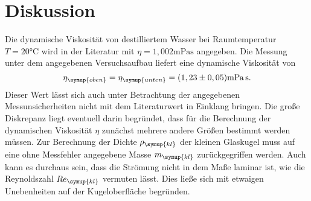 \section{Diskussion}
\label{sec:Diskussion}
Die dynamische Viskosität von destilliertem Wasser bei Raumtemperatur $T=20\unit{\celsius}$ wird in der
Literatur mit $\eta = 1,002\unit{\milli\pascal\second}$ \cite{dichte} angegeben. Die Messung unter dem 
angegebenen Versuchsaufbau liefert eine dynamische Viskosität von 
\begin{equation}
  \eta_{\symup{oben}} = \eta_{\symup{unten}} = (1,23\pm0,05)\unit{\milli\pascal\second}. \notag
\end{equation}
Dieser Wert lässt sich auch unter 
Betrachtung der angegebenen Messunsicherheiten nicht mit dem Literaturwert in Einklang bringen. Die große Diskrepanz liegt
eventuell darin begründet, dass für die Berechnung der dynamischen Viskosität $\eta$ zunächst mehrere andere Größen 
bestimmt werden müssen. Zur Berechnung der Dichte $\rho_{\symup{kl}}$ der kleinen Glaskugel muss auf eine ohne Messfehler 
angegebene Masse $m_{\symup{kl}}$ zurückgegriffen werden. Auch kann es durchaus sein, dass die Strömung nicht in dem Maße
laminar ist, wie die Reynoldszahl $Re_{\symup{kl}}$ vermuten lässt. Dies ließe sich mit etwaigen Unebenheiten auf der Kugeloberfläche
begründen. 

